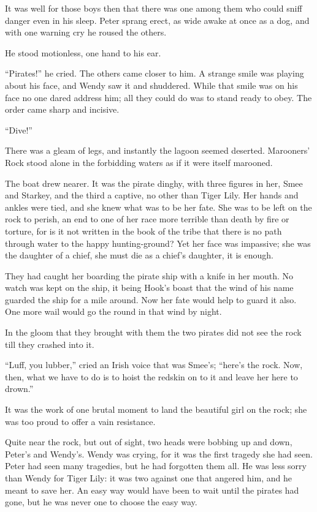 It was well for those boys then that there was one among them who could
sniff danger even in his sleep. Peter sprang erect, as wide awake at
once as a dog, and with one warning cry he roused the others.

He stood motionless, one hand to his ear.

``Pirates!'' he cried. The others came closer to him. A strange smile was
playing about his face, and Wendy saw it and shuddered. While that
smile was on his face no one dared address him; all they could do was
to stand ready to obey. The order came sharp and incisive.

``Dive!''

There was a gleam of legs, and instantly the lagoon seemed deserted.
Marooners' Rock stood alone in the forbidding waters as if it were
itself marooned.

The boat drew nearer. It was the pirate dinghy, with three figures in
her, Smee and Starkey, and the third a captive, no other than Tiger
Lily. Her hands and ankles were tied, and she knew what was to be her
fate. She was to be left on the rock to perish, an end to one of her
race more terrible than death by fire or torture, for is it not written
in the book of the tribe that there is no path through water to the
happy hunting-ground? Yet her face was impassive; she was the daughter
of a chief, she must die as a chief's daughter, it is enough.

They had caught her boarding the pirate ship with a knife in her mouth.
No watch was kept on the ship, it being Hook's boast that the wind of
his name guarded the ship for a mile around. Now her fate would help to
guard it also. One more wail would go the round in that wind by night.

In the gloom that they brought with them the two pirates did not see
the rock till they crashed into it.

``Luff, you lubber,'' cried an Irish voice that was Smee's; ``here's the
rock. Now, then, what we have to do is to hoist the redskin on to it
and leave her here to drown.''

It was the work of one brutal moment to land the beautiful girl on the
rock; she was too proud to offer a vain resistance.

Quite near the rock, but out of sight, two heads were bobbing up and
down, Peter's and Wendy's. Wendy was crying, for it was the first
tragedy she had seen. Peter had seen many tragedies, but he had
forgotten them all. He was less sorry than Wendy for Tiger Lily: it was
two against one that angered him, and he meant to save her. An easy way
would have been to wait until the pirates had gone, but he was never
one to choose the easy way.

